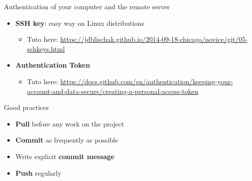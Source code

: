 \documentclass[10pt]{beamer}
\begin{document}
\begin{frame}{Authentication of your computer and the remote server}
    \begin{itemize}
        \item \textbf{SSH key}: easy way on Linux distributions
        \begin{itemize}
            \item Tuto here: \url{https://jdblischak.github.io/2014-09-18-chicago/novice/git/05-sshkeys.html}
        \end{itemize}
        \vspace{0.2cm}
        \item \textbf{Authentication Token}
            \begin{itemize}
            \item Tuto here:  \url{https://docs.github.com/en/authentication/keeping-your-account-and-data-secure/creating-a-personal-access-token}
        \end{itemize}
    \end{itemize}
\end{frame}

\begin{frame}{Good practices}
    \begin{itemize}
        \item \textbf{Pull} before any work on the project
        \vspace{0.2cm}
        \item \textbf{Commit} as frequently as possible
        \vspace{0.2cm}
        \item Write explicit \textbf{commit message}
        \vspace{0.2cm}
        \item \textbf{Push} regularly
        
    \end{itemize}
\end{frame}
\end{document}
